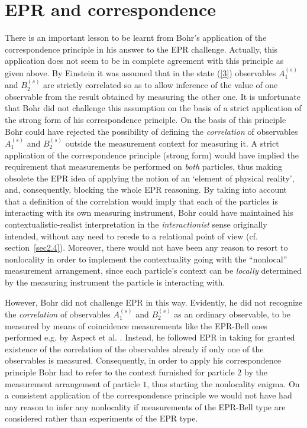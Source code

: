 \documentclass[12pt]{article}
\begin{document}
\section{EPR and correspondence}\label{sec2.5.1}
There is an important lesson to be learnt from Bohr's
\cite{Bohr35} application of the correspondence principle in his
answer to the EPR challenge. Actually, this application does not
seem to be in complete agreement with this principle as given
above. By Einstein it was assumed that in the state (\ref{3})
observables $A_1^{(s)} $ and $B_2^{(s)} $ are strictly correlated
so as to allow inference of the value of one observable from the
result obtained by measuring the other one. It is unfortunate that
Bohr did not challenge this assumption on the basis of a strict
application of the strong form of his correspondence principle. On
the basis of this principle Bohr could have rejected the
possibility of defining the {\em correlation} of observables
$A_1^{(s)} $ and $B_2^{(s)} $ outside the measurement context for
measuring it. A strict application of the correspondence principle
(strong form) would have implied the requirement that measurements
be performed on {\em both} particles, thus making obsolete the EPR
idea of applying the notion of an `element of physical reality',
and, consequently, blocking the whole EPR reasoning. By taking
into account that a definition of the correlation would imply that
each of the particles is interacting with its own measuring
instrument, Bohr could have maintained his contextualistic-realist
interpretation in the {\em interactionist} sense originally
intended, without any need to recede to a relational point of view
(cf. section~\ref{sec2.4}). Moreover, there would not have been
any reason to resort to nonlocality in order to implement the
contextuality going with the ``nonlocal'' measurement arrangement,
since each particle's context can be {\em locally} determined by
the measuring instrument the particle is interacting with.

However, Bohr did not challenge EPR in this way. Evidently, he did
not recognize the {\em correlation} of observables $A_1^{(s)} $
and $B_2^{(s)} $ as an ordinary observable, to be measured by
means of coincidence measurements like the EPR-Bell ones performed
e.g. by Aspect et al. \cite{Asp81,Asp82}. Instead, he followed EPR in
taking for granted existence of the correlation of the observables
already if only one of the observables is measured. Consequently,
in order to apply his correspondence principle Bohr had to
refer to the context furnished for particle $2$ by the measurement
arrangement of particle $1$, thus starting the nonlocality enigma.
On a consistent application of the correspondence principle we
would not have had any reason to infer any nonlocality if
measurements of the EPR-Bell type are considered rather than
experiments of the EPR type.
\end{document}

